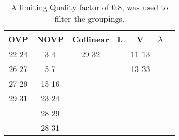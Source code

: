 \vspace{-5mm}
\begin{table}[htbp]
\begin{center}
\begin{tabular}{|c|c|c|c|c|c|c|}
\hline
OVP     & NOVP & Collinear & L     & V & $\lambda$  \\ \hline
22 24 & 3 4   & 29 32 & & 11 13 & \\ \hline
26 27 & 5 7   &       & & 13 33 & \\ \hline
27 29 & 15 16 &       & &       & \\ \hline
29 31 & 23 24 &       & &       & \\ \hline
      & 28 29 &       & &       & \\ \hline
      & 28 31 &       & &       & \\ \hline
\end{tabular}
\label{tbl:groupings2}
\end{center}
\vspace{-5mm}
\caption{A limiting Quality factor of 0.8, was used to filter the groupings. }
\end{table}
